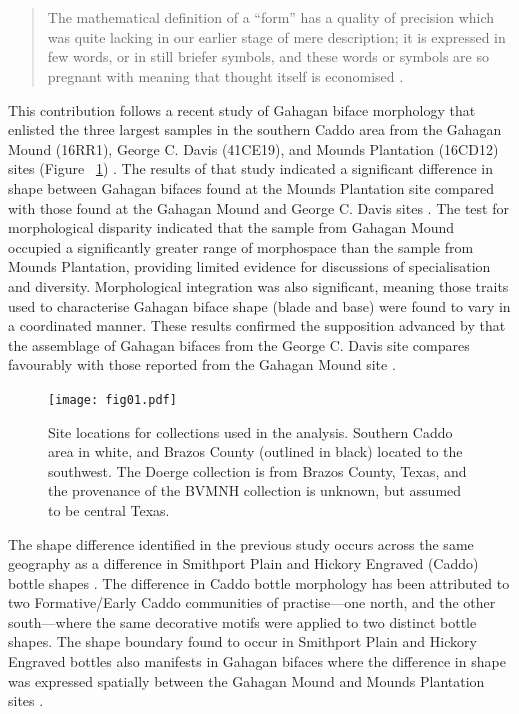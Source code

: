 \documentclass[review]{elsarticle}
\begin{document}
\linenumbers

\section*{}

\begin{quote}
The mathematical definition of a ``form'' has a quality of precision which was quite lacking in our earlier stage of mere description; it is expressed in few words, or in still briefer symbols, and these words or symbols are so pregnant with meaning that thought itself is economised \citep[720-721]{RN11532}.    
\end{quote}

This contribution follows a recent study of Gahagan biface morphology that enlisted the three largest samples in the southern Caddo area from the Gahagan Mound (16RR1), George C. Davis (41CE19), and Mounds Plantation (16CD12) sites (Figure ~\ref{fig:fig01}) \citep{RN11783}. The results of that study indicated a significant difference in shape between Gahagan bifaces found at the Mounds Plantation site compared with those found at the Gahagan Mound and George C. Davis sites \citep[Figure 7]{RN11783}. The test for morphological disparity indicated that the sample from Gahagan Mound occupied a significantly greater range of morphospace than the sample from Mounds Plantation, providing limited evidence for discussions of specialisation and diversity. Morphological integration was also significant, meaning those traits used to characterise Gahagan biface shape (blade and base) were found to vary in a coordinated manner. These results confirmed the supposition advanced by \cite{RN3684} that the assemblage of Gahagan bifaces from the George C. Davis site compares favourably with those reported from the Gahagan Mound site \citep{RN2740,RN5274}.

\begin{figure}[ht]\centering
\texttt{[image: fig01.pdf]}
\caption{Site locations for collections used in the analysis. Southern Caddo area in white, and Brazos County (outlined in black) located to the southwest. The Doerge collection is from Brazos County, Texas, and the provenance of the BVMNH collection is unknown, but assumed to be central Texas.}
\label{fig:fig01}
\end{figure}

The shape difference identified in the previous study occurs across the same geography as a difference in Smithport Plain and Hickory Engraved (Caddo) bottle shapes \citep{RN11801,RN11782,RN11716,RN20852}. The difference in Caddo bottle morphology has been attributed to two Formative/Early Caddo communities of practise---one north, and the other south---where the same decorative motifs were applied to two distinct bottle shapes. The shape boundary found to occur in Smithport Plain and Hickory Engraved bottles \citep[Figure 1]{RN20852} also manifests in Gahagan bifaces where the difference in shape was expressed spatially between the Gahagan Mound and Mounds Plantation sites \citep{RN11783}. 
\end{document}
